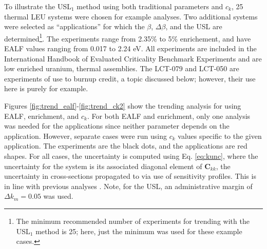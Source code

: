 To illustrate the USL$_1$ method using both traditional parameters 
and $c_k$, 25 thermal LEU systems were chosen for example analyses.  
Two additional systems were selected as ``applications'' for which 
the $\beta$, $\Delta \beta$, and the USL are determined\footnote{The 
minimum recommended number of experiments for trending with the 
USL$_1$ method is 25; here, just the minimum was used for these example 
cases.}. The experiments range from 2.35\% to 5\% enrichement, and have 
EALF values ranging from 0.017 to 2.24 eV.  %
All experiments 
are included in the International Handbook of Evaluated Criticality Benchmark 
Experiments \cite{ihecsbe} and are low enriched uranium, thermal assemblies.
The LCT-079 and LCT-050 are experiments
of use to burnup credit, a topic discussed below; however, their use here
is purely for example.  

Figures \ref{fig:trend_ealf}-\ref{fig:trend_ck2} show the trending analysis 
for using EALF, enrichment, and $c_k$.  For both EALF and enrichment, only 
one analysis was needed for the applications since neither parameter depends 
on the application.  However, separate cases were run using $c_k$ values 
specific to the given application.  The experiments are the black dots, 
and the applications are red shapes.  For all cases, the uncertainty is 
computed using Eq. \ref{eq:kunc}, where the uncertainty for the system is 
its associated diagonal element of $\mathbf{C}_{kk}$, \ie the uncertainty 
in cross-sections propagated to \keff via use of sensitivity profiles.  
This is in line with previous analyses \cite{broadhead2004sau}.  Note, for 
the USL, an administrative margin of $\Delta k_m = 0.05$ was used.

